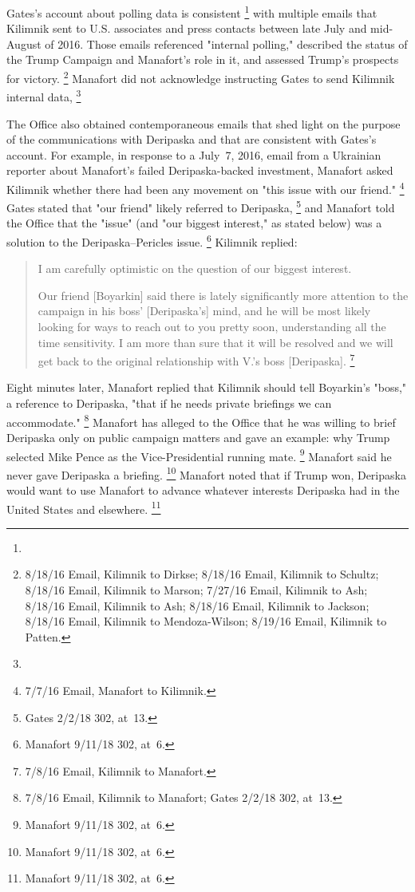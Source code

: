 Gates's account about polling data is consistent
\footnote{}
with multiple emails that Kilimnik sent to U.S. associates and press contacts between late July and mid-August of 2016.
Those emails referenced "internal polling," described the status of the Trump Campaign and Manafort's role in it, and assessed Trump's prospects for victory.%
\footnote{8/18/16 Email, Kilimnik to Dirkse;
8/18/16 Email, Kilimnik to Schultz;
8/18/16 Email, Kilimnik to Marson;
7/27/16 Email, Kilimnik to Ash;
8/18/16 Email, Kilimnik to Ash;
8/18/16 Email, Kilimnik to Jackson;
8/18/16 Email, Kilimnik to Mendoza-Wilson;
8/19/16 Email, Kilimnik to Patten.}
Manafort did not acknowledge instructing Gates to send Kilimnik internal data,
\footnote{}

The Office also obtained contemporaneous emails that shed light on the purpose of the communications with Deripaska and that are consistent with Gates's account.
For example, in response to a July~7, 2016, email from a Ukrainian reporter about Manafort's failed Deripaska-backed investment, Manafort asked Kilimnik whether there had been any movement on "this issue with our friend."%
\footnote{7/7/16 Email, Manafort to Kilimnik.}
Gates stated that "our friend" likely referred to Deripaska,%
\footnote{Gates 2/2/18 302, at~13.}
and Manafort told the Office that the "issue" (and "our biggest interest," as stated below) was a solution to the Deripaska--Pericles issue.%
\footnote{Manafort 9/11/18 302, at~6.}
Kilimnik replied:

\begin{quote}
I am carefully optimistic on the question of our biggest interest.

Our friend [Boyarkin] said there is lately significantly more attention to the campaign in his boss' [Deripaska's] mind, and he will be most likely looking for ways to reach out to you pretty soon, understanding all the time sensitivity.
I am more than sure that it will be resolved and we will get back to the original relationship with V.'s boss [Deripaska].%
\footnote{7/8/16 Email, Kilimnik to Manafort.}
\end{quote}

Eight minutes later, Manafort replied that Kilimnik should tell Boyarkin's "boss," a reference to Deripaska, "that if he needs private briefings we can accommodate."%
\footnote{7/8/16 Email, Kilimnik to Manafort;
Gates 2/2/18 302, at~13.}
Manafort has alleged to the Office that he was willing to brief Deripaska only on public campaign matters and gave an example: why Trump selected Mike Pence as the Vice-Presidential running mate.%
\footnote{Manafort 9/11/18 302, at~6.}
Manafort said he never gave Deripaska a briefing.%
\footnote{Manafort 9/11/18 302, at~6.}
Manafort noted that if Trump won, Deripaska would want to use Manafort to advance whatever interests Deripaska had in the United States and elsewhere.%
\footnote{Manafort 9/11/18 302, at~6.}

